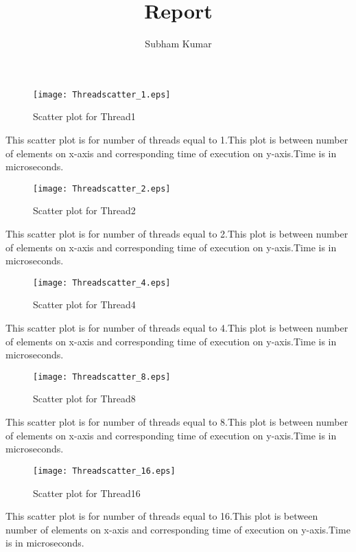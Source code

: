 \documentclass[a4paper, 10pt]{report}
\title{Report}
\author{Subham Kumar}
\date{}
\begin{document}
\maketitle
 


\begin{figure}
\centering
\texttt{[image: Threadscatter\_1.eps]}
 \caption{Scatter plot for Thread1}
 \label{fig:Threadscatter_1}
\end{figure}

This scatter plot is for number of threads equal to 1.This plot is between number of elements on x-axis and corresponding time of execution on y-axis.Time is in microseconds.
\newpage
\begin{figure}
\centering
\texttt{[image: Threadscatter\_2.eps]}
 \caption{Scatter plot for Thread2}
 \label{fig:Threadscatter_2}
\end{figure}

This scatter plot is for number of threads equal to 2.This plot is between number of elements on x-axis and corresponding time of execution on y-axis.Time is in microseconds.
\newpage
\begin{figure}
\centering
\texttt{[image: Threadscatter\_4.eps]}
 \caption{Scatter plot for Thread4}
 \label{fig:Threadscatter_4}
\end{figure}

This scatter plot is for number of threads equal to 4.This plot is between number of elements on x-axis and corresponding time of execution on y-axis.Time is in microseconds.
\newpage
\begin{figure}
\centering
\texttt{[image: Threadscatter\_8.eps]}
 \caption{Scatter plot for Thread8}
 \label{fig:Threadscatter_8}
\end{figure}

This scatter plot is for number of threads equal to 8.This plot is between number of elements on x-axis and corresponding time of execution on y-axis.Time is in microseconds.
\newpage
\begin{figure}
\centering
\texttt{[image: Threadscatter\_16.eps]}
 \caption{Scatter plot for Thread16}
 \label{fig:Threadscatter_16}
\end{figure}

This scatter plot is for number of threads equal to 16.This plot is between number of elements on x-axis and corresponding time of execution on y-axis.Time is in microseconds.
\end{document}

